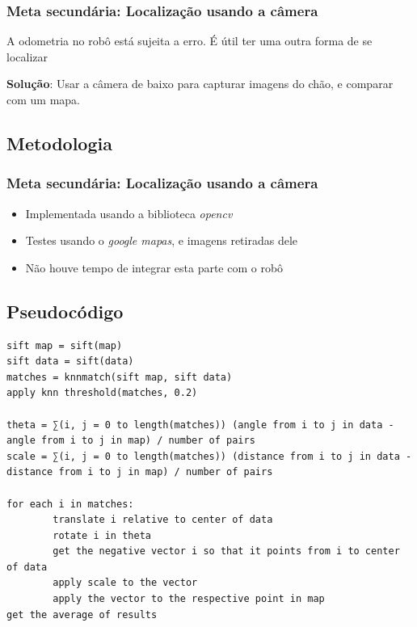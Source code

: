 \documentclass[]{beamer}
\begin{document}
\begin{frame}
\frametitle{Meta secundária: Localização usando a câmera}

A odometria no robô está sujeita a erro. É útil ter uma outra forma de se localizar
\vspace{2.0ex}

\textbf{Solução}: Usar a câmera de baixo para capturar imagens do chão, e comparar com um mapa.

\end{frame}

\subsection{Metodologia}

\begin{frame}
\frametitle{Meta secundária: Localização usando a câmera}
\begin{itemize}
\item Implementada usando a biblioteca \emph{opencv}
\item Testes usando o \emph{google mapas}, e imagens retiradas dele
\item Não houve tempo de integrar esta parte com o robô
\end{itemize}

\end{frame}

\subsection{Pseudocódigo}
\begin{frame}[fragile]

\begin{verbatim}
sift map = sift(map)
sift data = sift(data)
matches = knnmatch(sift map, sift data)
apply knn threshold(matches, 0.2)

theta = ∑(i, j = 0 to length(matches)) (angle from i to j in data - angle from i to j in map) / number of pairs
scale = ∑(i, j = 0 to length(matches)) (distance from i to j in data - distance from i to j in map) / number of pairs

for each i in matches:
        translate i relative to center of data
        rotate i in theta
        get the negative vector i so that it points from i to center of data
        apply scale to the vector
        apply the vector to the respective point in map
get the average of results
\end{verbatim}
\end{frame}
\end{document}
